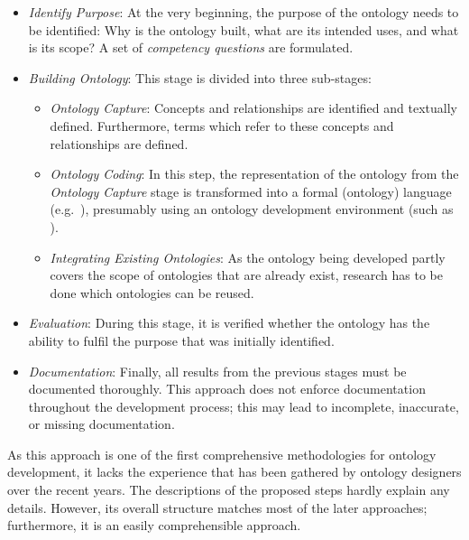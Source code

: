 \begin{itemize}
  \item \emph{Identify Purpose}: At the very beginning, the purpose of the ontology needs to be identified: Why is the ontology built, what are its intended uses, and what is its scope? A set of \emph{competency questions} are formulated.
  
  \item \emph{Building Ontology}: This stage is divided into three sub-stages:
    \begin{itemize}
      \item \emph{Ontology Capture}: Concepts and relationships are identified and textually defined. Furthermore, terms which refer to these concepts and relationships are defined.
      
      \item \emph{Ontology Coding}: In this step, the representation of the ontology from the \emph{Ontology Capture} stage is transformed into a formal (ontology) language (e.g.\ ), presumably using an ontology development environment (such as \protege).
      
      \item \emph{Integrating Existing Ontologies}: As the ontology being developed partly covers the scope of ontologies that are already exist, research has to be done which ontologies can be reused.
    \end{itemize}
    
  \item \emph{Evaluation}: During this stage, it is verified whether the ontology has the ability to fulfil the purpose that was initially identified.
  
  \item \emph{Documentation}: Finally, all results from the previous stages must be documented thoroughly. This approach does not enforce documentation throughout the development process; this may lead to incomplete, inaccurate, or missing documentation.
    
\end{itemize}

As this approach is one of the first comprehensive methodologies for ontology development, it lacks the experience that has been gathered by ontology designers over the recent years. The descriptions of the proposed steps hardly explain any details. However, its overall structure matches most of the later approaches; furthermore, it is an easily comprehensible approach.

